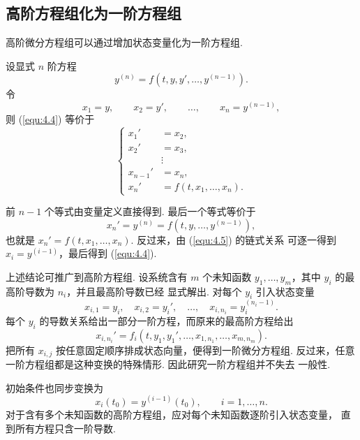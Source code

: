 \subsection{高阶方程组化为一阶方程组}

高阶微分方程组可以通过增加状态变量化为一阶方程组.

\begin{prop}\label{prop:4.1.1}
设显式 $n$ 阶方程
\begin{equation}\label{equ:4.4}
y^{(n)}=f\left(t,y,y',\ldots,y^{(n-1)}\right).
\end{equation}
令
\[
x_1=y,\qquad x_2=y',\qquad\ldots,\qquad x_n=y^{(n-1)},
\]
则 (\ref{equ:4.4}) 等价于
\begin{equation}\label{equ:4.5}
\left\{
\begin{aligned}
x_1'&=x_2,\\
x_2'&=x_3,\\
&\vdots\\
x_{n-1}'&=x_n,\\
x_n'&=f(t,x_1,\ldots,x_n).
\end{aligned}
\right.
\end{equation}
\end{prop}

\begin{pf1}
前 $n-1$ 个等式由变量定义直接得到. 最后一个等式等价于
\[
x_n'=y^{(n)}=f(t,y,\ldots,y^{(n-1)}),
\]
也就是 $x_n'=f(t,x_1,\ldots,x_n)$. 反过来，由 (\ref{equ:4.5}) 的链式关系
可逐一得到 $x_i=y^{(i-1)}$，最后得到 (\ref{equ:4.4}).
\end{pf1}

上述结论可推广到高阶方程组. 设系统含有 $m$ 个未知函数
$y_1,\ldots,y_m$，其中 $y_i$ 的最高阶导数为 $n_i$，并且最高阶导数已经
显式解出. 对每个 $y_i$ 引入状态变量
\[
x_{i,1}=y_i,\quad x_{i,2}=y_i',\quad\ldots,\quad
x_{i,n_i}=y_i^{(n_i-1)}.
\]
每个 $y_i$ 的导数关系给出一部分一阶方程，而原来的最高阶方程给出
\[
x_{i,n_i}'=
f_i\left(t,y_1,y_1',\ldots,x_{1,n_1},\ldots,x_{m,n_m}\right).
\]
把所有 $x_{i,j}$ 按任意固定顺序排成状态向量，便得到一阶微分方程组.
反过来，任意一阶方程组都是这种变换的特殊情形. 因此研究一阶方程组并不失去
一般性.

初始条件也同步变换为
\[
x_i(t_0)=y^{(i-1)}(t_0),\qquad i=1,\ldots,n.
\]
对于含有多个未知函数的高阶方程组，应对每个未知函数逐阶引入状态变量，
直到所有方程只含一阶导数.

